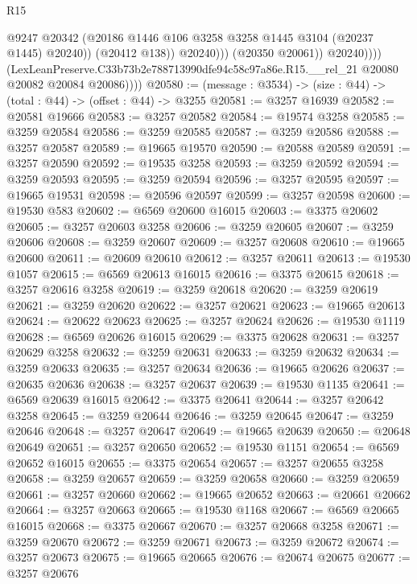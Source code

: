 \begin{lexlean}{R15}
\begin{coremodule}
                              @9247
                              @20342
                              (@20186 @1446 @106 @3258 @3258 @1445 @3104 (@20237 @1445) @20240))
                            (@20412 @138))
                          @20240)))
                    (@20350 @20061))
                  @20240))))
          (LexLeanPreserve.C33b73b2e788713990dfe94c58c97a86e.R15.__rel_21
            @20080
            @20082
            @20084
            @20086))))
@20580 := (message : @3534) -> (size : @44) -> (total : @44) -> (offset : @44) -> @3255
@20581 := @3257 @16939
@20582 := @20581 @19666
@20583 := @3257 @20582
@20584 := @19574 @3258
@20585 := @3259 @20584
@20586 := @3259 @20585
@20587 := @3259 @20586
@20588 := @3257 @20587
@20589 := @19665 @19570
@20590 := @20588 @20589
@20591 := @3257 @20590
@20592 := @19535 @3258
@20593 := @3259 @20592
@20594 := @3259 @20593
@20595 := @3259 @20594
@20596 := @3257 @20595
@20597 := @19665 @19531
@20598 := @20596 @20597
@20599 := @3257 @20598
@20600 := @19530 @583
@20602 := @6569 @20600 @16015
@20603 := @3375 @20602
@20605 := @3257 @20603 @3258
@20606 := @3259 @20605
@20607 := @3259 @20606
@20608 := @3259 @20607
@20609 := @3257 @20608
@20610 := @19665 @20600
@20611 := @20609 @20610
@20612 := @3257 @20611
@20613 := @19530 @1057
@20615 := @6569 @20613 @16015
@20616 := @3375 @20615
@20618 := @3257 @20616 @3258
@20619 := @3259 @20618
@20620 := @3259 @20619
@20621 := @3259 @20620
@20622 := @3257 @20621
@20623 := @19665 @20613
@20624 := @20622 @20623
@20625 := @3257 @20624
@20626 := @19530 @1119
@20628 := @6569 @20626 @16015
@20629 := @3375 @20628
@20631 := @3257 @20629 @3258
@20632 := @3259 @20631
@20633 := @3259 @20632
@20634 := @3259 @20633
@20635 := @3257 @20634
@20636 := @19665 @20626
@20637 := @20635 @20636
@20638 := @3257 @20637
@20639 := @19530 @1135
@20641 := @6569 @20639 @16015
@20642 := @3375 @20641
@20644 := @3257 @20642 @3258
@20645 := @3259 @20644
@20646 := @3259 @20645
@20647 := @3259 @20646
@20648 := @3257 @20647
@20649 := @19665 @20639
@20650 := @20648 @20649
@20651 := @3257 @20650
@20652 := @19530 @1151
@20654 := @6569 @20652 @16015
@20655 := @3375 @20654
@20657 := @3257 @20655 @3258
@20658 := @3259 @20657
@20659 := @3259 @20658
@20660 := @3259 @20659
@20661 := @3257 @20660
@20662 := @19665 @20652
@20663 := @20661 @20662
@20664 := @3257 @20663
@20665 := @19530 @1168
@20667 := @6569 @20665 @16015
@20668 := @3375 @20667
@20670 := @3257 @20668 @3258
@20671 := @3259 @20670
@20672 := @3259 @20671
@20673 := @3259 @20672
@20674 := @3257 @20673
@20675 := @19665 @20665
@20676 := @20674 @20675
@20677 := @3257 @20676

\end{coremodule}
\end{lexlean}
